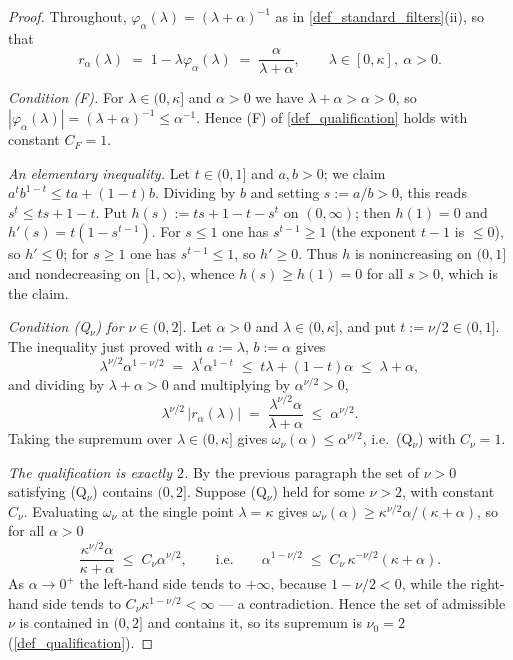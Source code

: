 \documentclass[a4paper]{report}
\theoremstyle{plain}
\theoremstyle{definition}
\theoremstyle{remark}
\begin{document}
\begin{proof}
  Throughout, $\varphi_{\alpha}(\lambda) = (\lambda+\alpha)^{-1}$ as in
  \cref{def_standard_filters}(ii), so that
  \[
    r_{\alpha}(\lambda) \;=\; 1 - \lambda\varphi_{\alpha}(\lambda)
      \;=\; \frac{\alpha}{\lambda + \alpha}, \qquad \lambda \in [0,\kappa],\ \alpha > 0 .
  \]

  \emph{Condition (F).}  For $\lambda \in (0,\kappa]$ and $\alpha > 0$ we have
  $\lambda + \alpha > \alpha > 0$, so $|\varphi_{\alpha}(\lambda)| = (\lambda +
  \alpha)^{-1} \le \alpha^{-1}$.  Hence (F) of \cref{def_qualification} holds with
  constant $C_F = 1$.

  \emph{An elementary inequality.}  Let $t \in (0,1]$ and $a, b > 0$; we claim
  $a^{t}b^{1-t} \le ta + (1-t)b$.  Dividing by $b$ and setting $s := a/b > 0$, this reads
  $s^{t} \le ts + 1 - t$.  Put $h(s) := ts + 1 - t - s^{t}$ on $(0,\infty)$; then
  $h(1) = 0$ and $h'(s) = t(1 - s^{t-1})$.  For $s \le 1$ one has $s^{t-1} \ge 1$ (the
  exponent $t-1$ is $\le 0$), so $h' \le 0$; for $s \ge 1$ one has $s^{t-1} \le 1$, so
  $h' \ge 0$.  Thus $h$ is nonincreasing on $(0,1]$ and nondecreasing on $[1,\infty)$,
  whence $h(s) \ge h(1) = 0$ for all $s > 0$, which is the claim.

  \emph{Condition (Q$_{\nu}$) for $\nu \in (0,2]$.}  Let $\alpha > 0$ and $\lambda \in
  (0,\kappa]$, and put $t := \nu/2 \in (0,1]$.  The inequality just proved with
  $a := \lambda$, $b := \alpha$ gives
  \[
    \lambda^{\nu/2}\alpha^{1-\nu/2} \;=\; \lambda^{t}\alpha^{1-t} \;\le\;
      t\lambda + (1-t)\alpha \;\le\; \lambda + \alpha ,
  \]
  and dividing by $\lambda + \alpha > 0$ and multiplying by $\alpha^{\nu/2} > 0$,
  \[
    \lambda^{\nu/2}\,|r_{\alpha}(\lambda)| \;=\;
      \frac{\lambda^{\nu/2}\alpha}{\lambda+\alpha} \;\le\; \alpha^{\nu/2} .
  \]
  Taking the supremum over $\lambda \in (0,\kappa]$ gives $\omega_{\nu}(\alpha) \le
  \alpha^{\nu/2}$, i.e.\ (Q$_{\nu}$) with $C_{\nu} = 1$.

  \emph{The qualification is exactly $2$.}  By the previous paragraph the set of $\nu >
  0$ satisfying (Q$_{\nu}$) contains $(0,2]$.  Suppose (Q$_{\nu}$) held for some
  $\nu > 2$, with constant $C_{\nu}$.  Evaluating $\omega_{\nu}$ at the single point
  $\lambda = \kappa$ gives $\omega_{\nu}(\alpha) \ge \kappa^{\nu/2}\alpha/(\kappa +
  \alpha)$, so for all $\alpha > 0$
  \[
    \frac{\kappa^{\nu/2}\alpha}{\kappa + \alpha} \;\le\; C_{\nu}\alpha^{\nu/2} ,
    \qquad\text{i.e.}\qquad
    \alpha^{1 - \nu/2} \;\le\; C_{\nu}\,\kappa^{-\nu/2}(\kappa + \alpha) .
  \]
  As $\alpha \to 0^{+}$ the left-hand side tends to $+\infty$, because $1 - \nu/2 < 0$,
  while the right-hand side tends to $C_{\nu}\kappa^{1-\nu/2} < \infty$ --- a
  contradiction.  Hence the set of admissible $\nu$ is contained in $(0,2]$ and contains
  it, so its supremum is $\nu_0 = 2$ (\cref{def_qualification}).
\end{proof}
\end{document}
